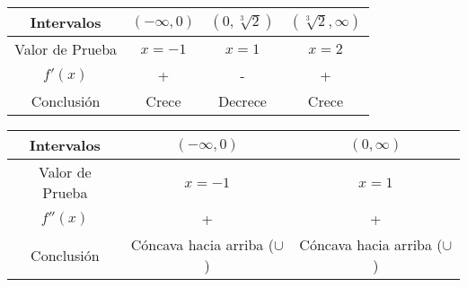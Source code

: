 \begin{center}
    \begin{tabular}{|c|c|c|c|}
        \hline
        Intervalos & $(-\infty,0)$ & $(0,\sqrt[3]{2})$ & $(\sqrt[3]{2},\infty)$ \\
        \hline
        Valor de Prueba & $x=-1$ & $x=1$ & $x=2$ \\
        \hline
        $f'(x)$ & + & - & + \\
        \hline
        Conclusión & Crece & Decrece & Crece \\
        \hline
    \end{tabular}
\end{center}

\begin{center}
    \begin{tabular}{|c|c|c|}
        \hline
        Intervalos & $(-\infty,0)$ & $(0,\infty)$ \\
        \hline
        Valor de Prueba & $x=-1$ & $x=1$ \\
        \hline
        $f''(x)$ & + & + \\
        \hline
        Conclusión & Cóncava hacia arriba ($\cup$) & Cóncava hacia arriba ($\cup$) \\
        \hline
    \end{tabular}
\end{center}

